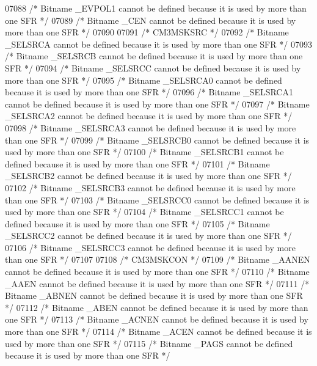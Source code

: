 \begin{DoxyCode}
07088 \textcolor{comment}{/* Bitname \_EVPOL1 cannot be defined because it is used by more than one SFR */}
07089 \textcolor{comment}{/* Bitname \_CEN cannot be defined because it is used by more than one SFR */}
07090 
07091 \textcolor{comment}{/* CM3MSKSRC */}
07092 \textcolor{comment}{/* Bitname \_SELSRCA cannot be defined because it is used by more than one SFR */}
07093 \textcolor{comment}{/* Bitname \_SELSRCB cannot be defined because it is used by more than one SFR */}
07094 \textcolor{comment}{/* Bitname \_SELSRCC cannot be defined because it is used by more than one SFR */}
07095 \textcolor{comment}{/* Bitname \_SELSRCA0 cannot be defined because it is used by more than one SFR */}
07096 \textcolor{comment}{/* Bitname \_SELSRCA1 cannot be defined because it is used by more than one SFR */}
07097 \textcolor{comment}{/* Bitname \_SELSRCA2 cannot be defined because it is used by more than one SFR */}
07098 \textcolor{comment}{/* Bitname \_SELSRCA3 cannot be defined because it is used by more than one SFR */}
07099 \textcolor{comment}{/* Bitname \_SELSRCB0 cannot be defined because it is used by more than one SFR */}
07100 \textcolor{comment}{/* Bitname \_SELSRCB1 cannot be defined because it is used by more than one SFR */}
07101 \textcolor{comment}{/* Bitname \_SELSRCB2 cannot be defined because it is used by more than one SFR */}
07102 \textcolor{comment}{/* Bitname \_SELSRCB3 cannot be defined because it is used by more than one SFR */}
07103 \textcolor{comment}{/* Bitname \_SELSRCC0 cannot be defined because it is used by more than one SFR */}
07104 \textcolor{comment}{/* Bitname \_SELSRCC1 cannot be defined because it is used by more than one SFR */}
07105 \textcolor{comment}{/* Bitname \_SELSRCC2 cannot be defined because it is used by more than one SFR */}
07106 \textcolor{comment}{/* Bitname \_SELSRCC3 cannot be defined because it is used by more than one SFR */}
07107 
07108 \textcolor{comment}{/* CM3MSKCON */}
07109 \textcolor{comment}{/* Bitname \_AANEN cannot be defined because it is used by more than one SFR */}
07110 \textcolor{comment}{/* Bitname \_AAEN cannot be defined because it is used by more than one SFR */}
07111 \textcolor{comment}{/* Bitname \_ABNEN cannot be defined because it is used by more than one SFR */}
07112 \textcolor{comment}{/* Bitname \_ABEN cannot be defined because it is used by more than one SFR */}
07113 \textcolor{comment}{/* Bitname \_ACNEN cannot be defined because it is used by more than one SFR */}
07114 \textcolor{comment}{/* Bitname \_ACEN cannot be defined because it is used by more than one SFR */}
07115 \textcolor{comment}{/* Bitname \_PAGS cannot be defined because it is used by more than one SFR */}

\end{DoxyCode}
